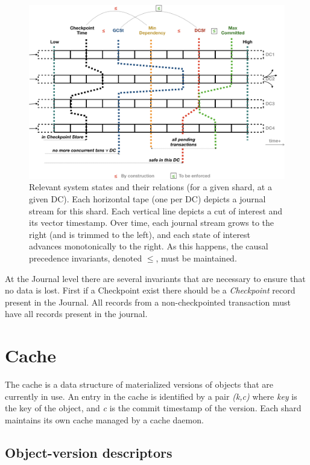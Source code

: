 \documentclass[twoside]{article}
\begin{document}
\begin{figure}[tp]
  \centering
  \includegraphics[width=\textwidth]{figures/cvts.png}
  \caption{%
    Relevant system states and their relations (for a given
    shard, at a given DC).
    Each horizontal tape (one per DC) depicts a journal stream for
    this shard.
    Each vertical line depicts a cut of interest and its
    vector timestamp.
    Over time, each journal stream grows to the right (and is
    trimmed to the left), and each state of interest advances
    monotonically to the right.
    As this happens, the causal precedence invariants, denoted
    $\le$, must be maintained.
  }
  \label{fig:system-vts}
\end{figure}

At the Journal level there are several invariants that are necessary to ensure that
no data is lost.
First if a Checkpoint exist there should be a \textit{Checkpoint} record present in
the Journal.
All records from a non-checkpointed transaction must have all records 
present in the journal.

\section{Cache}
\label{sec:cache}

The cache is a data structure of materialized versions of objects that are 
currently in use. 
An entry in the cache is identified by a pair \emph{(k,c)} where
\emph{key} is the key of the object, and \emph{c} is the commit timestamp of the
version. 
Each shard maintains its own cache managed by a cache daemon.

\subsection{Object-version descriptors}
\label{sec:objects}
\end{document}
